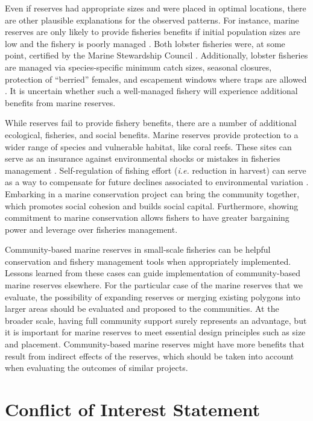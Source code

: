 \documentclass{frontiersSCNS}
\begin{document}
Even if reserves had appropriate sizes and were placed in optimal
locations, there are other plausible explanations for the observed
patterns. For instance, marine reserves are only likely to provide
fisheries benefits if initial population sizes are low and the fishery
is poorly managed \citep{hilborn_2006}. Both lobster fisheries were, at
some point, certified by the Marine Stewardship Council
\citep{prezramrez_2016-J1}. Additionally, lobster fisheries are managed
via species-specific minimum catch sizes, seasonal closures, protection
of ``berried'' females, and escapement windows where traps are allowed
\cite{dof_website_1993}. It is uncertain whether such a well-managed
fishery will experience additional benefits from marine reserves.

While reserves fail to provide fishery benefits, there are a number of
additional ecological, fisheries, and social benefits. Marine reserves
provide protection to a wider range of species and vulnerable habitat,
like coral reefs. These sites can serve as an insurance against
environmental shocks or mistakes in fisheries management
\citep{hilborn_2004,hilborn_2006,micheli_2012-EU}. Self-regulation of
fishing effort (\emph{i.e.} reduction in harvest) can serve as a way to
compensate for future declines associated to environmental variation
\citep{finkbeiner_2018}. Embarking in a marine conservation project can
bring the community together, which promotes social cohesion and builds
social capital. Furthermore, showing commitment to marine conservation
allows fishers to have greater bargaining power and leverage over
fisheries management.

Community-based marine reserves in small-scale fisheries can be helpful
conservation and fishery management tools when appropriately
implemented. Lessons learned from these cases can guide implementation
of community-based marine reserves elsewhere. For the particular case of
the marine reserves that we evaluate, the possibility of expanding
reserves or merging existing polygons into larger areas should be
evaluated and proposed to the communities. At the broader scale, having
full community support surely represents an advantage, but it is
important for marine reserves to meet essential design principles such
as size and placement. Community-based marine reserves might have more
benefits that result from indirect effects of the reserves, which should
be taken into account when evaluating the outcomes of similar projects.

\section*{Conflict of Interest Statement}
\end{document}
